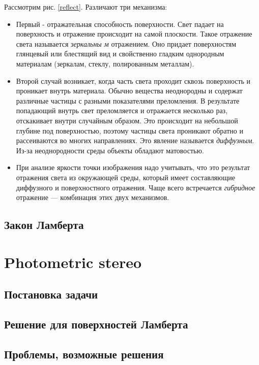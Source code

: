 \documentclass[12pt]{article}
\begin{document}
Рассмотрим рис. \eqref{reflect}. Различают три механизма:
\begin{itemize}
  \item Первый - отражательная способность поверхности. Свет падает на поверхность
        и отражение происходит на самой плоскости. Такое отражение света называется
        \textit{зеркальны м} отражением. Оно придает поверхностям глянцевый или блестящий
        вид и свойственно гладким однородным материалам (зеркалам, стеклу, полированным металлам).
  \item Второй случай возникает, когда часть света проходит сквозь поверхность
        и проникает внутрь материала. Обычно вещества неоднородны и содержат различные
        частицы с разными показателями преломления. В результате попадающий внутрь свет
        преломляется и отражается несколько раз, отскакивает внутри случайным образом.
        Это происходит на небольшой глубине под поверхностью, поэтому частицы света
        проникают обратно и рассеиваются во многих направлениях.
        Это явление называется \textit{диффузным}. Из-за неоднородности среды
        объекты обладают матовостью.
  \item При анализе яркости точки изображения надо учитывать, что это результат отражения света из окружающей среды, который имеет составляющие
        диффузного и поверхностного отражения. Чаще всего встречается \textit{гибридное} отражение — комбинация этих двух механизмов.
\end{itemize}
\subsection{Закон Ламберта}

\section{Photometric stereo}

\subsection{Постановка задачи}
\subsection{Решение для поверхностей Ламберта}
\subsection{Проблемы, возможные решения}
\end{document}
